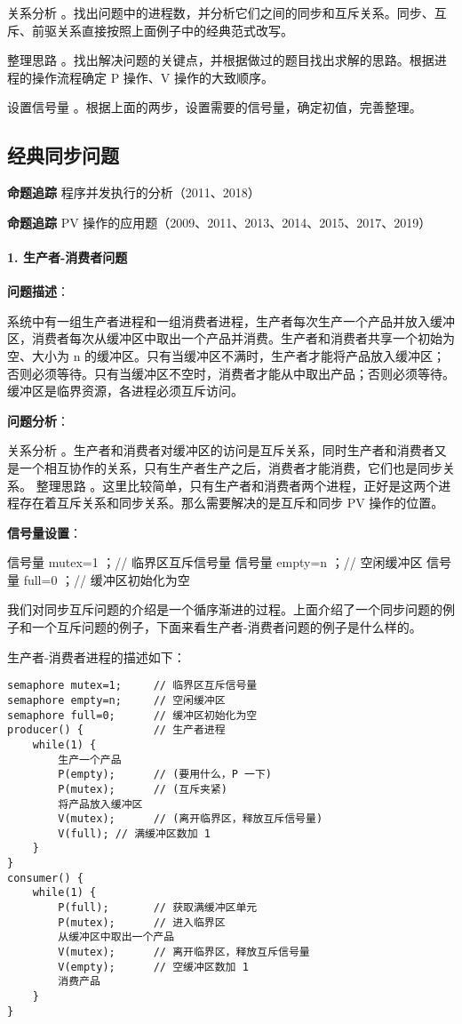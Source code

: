 \documentclass{ctexbook}
\begin{document}
关系分析 。找出问题中的进程数，并分析它们之间的同步和互斥关系。同步、互斥、前驱关系直接按照上面例子中的经典范式改写。

整理思路 。找出解决问题的关键点，并根据做过的题目找出求解的思路。根据进程的操作流程确定 P 操作、V 操作的大致顺序。

设置信号量 。根据上面的两步，设置需要的信号量，确定初值，完善整理。
\subsection{经典同步问题}

\textbf{命题追踪} 程序并发执行的分析（2011、2018）

\textbf{命题追踪} PV 操作的应用题（2009、2011、2013、2014、2015、2017、2019）

\paragraph{1. 生产者-消费者问题}

\textbf{问题描述}：

系统中有一组生产者进程和一组消费者进程，生产者每次生产一个产品并放入缓冲区，消费者每次从缓冲区中取出一个产品并消费。生产者和消费者共享一个初始为空、大小为 n 的缓冲区。只有当缓冲区不满时，生产者才能将产品放入缓冲区；否则必须等待。只有当缓冲区不空时，消费者才能从中取出产品；否则必须等待。缓冲区是临界资源，各进程必须互斥访问。

\textbf{问题分析}：

关系分析 。生产者和消费者对缓冲区的访问是互斥关系，同时生产者和消费者又是一个相互协作的关系，只有生产者生产之后，消费者才能消费，它们也是同步关系。
整理思路 。这里比较简单，只有生产者和消费者两个进程，正好是这两个进程存在着互斥关系和同步关系。那么需要解决的是互斥和同步 PV 操作的位置。

\textbf{信号量设置}：

信号量 mutex=1 ；// 临界区互斥信号量
信号量 empty=n ；// 空闲缓冲区
信号量 full=0 ；// 缓冲区初始化为空

我们对同步互斥问题的介绍是一个循序渐进的过程。上面介绍了一个同步问题的例子和一个互斥问题的例子，下面来看生产者-消费者问题的例子是什么样的。

生产者-消费者进程的描述如下：

\begin{lstlisting}
semaphore mutex=1;     // 临界区互斥信号量
semaphore empty=n;     // 空闲缓冲区
semaphore full=0;      // 缓冲区初始化为空
producer() {           // 生产者进程
	while(1) {
		生产一个产品
		P(empty);      // (要用什么，P 一下)
		P(mutex);      // (互斥夹紧)
		将产品放入缓冲区
		V(mutex);      // (离开临界区，释放互斥信号量)
		V(full); // 满缓冲区数加 1
	}
}
consumer() {
	while(1) {
		P(full);       // 获取满缓冲区单元
		P(mutex);      // 进入临界区
		从缓冲区中取出一个产品
		V(mutex);      // 离开临界区，释放互斥信号量
		V(empty);      // 空缓冲区数加 1
		消费产品
	}
}
\end{lstlisting}
\end{document}
